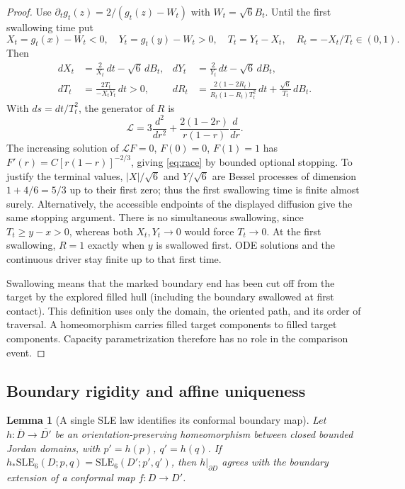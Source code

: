 \documentclass[11pt]{article}
\newtheorem{lemma}[theorem]{Lemma}
\theoremstyle{definition}\newtheorem{definition}[theorem]{Definition}
\theoremstyle{remark}\newtheorem{remark}[theorem]{Remark}
\newcommand{\SLE}{\mathrm{SLE}_6}
\begin{document}
\begin{proof}
Use $\partial_tg_t(z)=2/(g_t(z)-W_t)$ with $W_t=\sqrt6 B_t$. Until the
first swallowing time put
\[
 X_t=g_t(x)-W_t<0,\quad Y_t=g_t(y)-W_t>0,\quad
 T_t=Y_t-X_t,\quad R_t=-X_t/T_t\in(0,1).
\]
Then
\begin{align*}
 dX_t&=\frac{2}{X_t}\,dt-\sqrt6\,dB_t,&
 dY_t&=\frac{2}{Y_t}\,dt-\sqrt6\,dB_t,\\
 dT_t&=\frac{2T_t}{-X_tY_t}\,dt>0,&
 dR_t&=\frac{2(1-2R_t)}{R_t(1-R_t)T_t^2}\,dt
                 +\frac{\sqrt6}{T_t}\,dB_t.
\end{align*}
With $ds=dt/T_t^2$, the generator of $R$ is
\[
 \mathcal L=3\frac{d^2}{dr^2}
       +\frac{2(1-2r)}{r(1-r)}\frac d{dr}.
\]
The increasing solution of $\mathcal LF=0$, $F(0)=0$, $F(1)=1$ has
$F'(r)=C[r(1-r)]^{-2/3}$, giving \eqref{eq:race} by bounded optional
stopping. To justify the terminal values, $|X|/\sqrt6$ and $Y/\sqrt6$
are Bessel processes of dimension $1+4/6=5/3$ up to their first zero;
thus the first swallowing time is finite almost surely. Alternatively,
the accessible endpoints of the displayed diffusion give the same stopping
argument. There is no simultaneous swallowing, since $T_t\geq y-x>0$,
whereas both $X_t,Y_t\to0$ would force $T_t\to0$. At the first swallowing,
$R=1$ exactly when $y$ is swallowed first. ODE solutions and the continuous
driver stay finite up to that first time.

Swallowing means that the marked boundary end has been cut off from the
target by the explored filled hull (including the boundary swallowed at
first contact). This definition uses only the domain, the oriented path,
and its order of traversal. A homeomorphism carries filled target
components to filled target components. Capacity parametrization therefore
has no role in the comparison event.
\end{proof}

\subsection{Boundary rigidity and affine uniqueness}

\begin{lemma}[A single SLE law identifies its conformal boundary map]
\label{lem:boundary-rigidity}
Let $h:\overline D\to\overline{D'}$ be an orientation-preserving
homeomorphism between closed bounded Jordan domains, with
$p'=h(p)$, $q'=h(q)$. If $h_*\SLE(D;p,q)=\SLE(D';p',q')$, then
$h|_{\partial D}$ agrees with the boundary extension of a conformal
map $f:D\to D'$.
\end{lemma}
\end{document}
